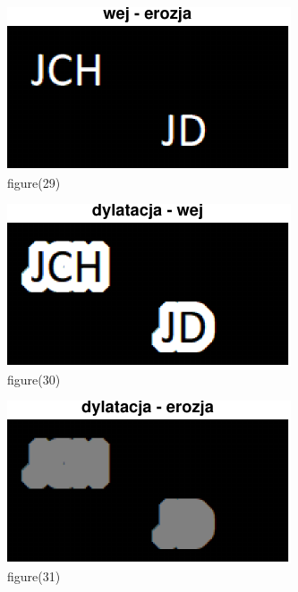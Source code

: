 \documentclass[10pt,a4paper,twoside]{article}%
\begin{document}
\begin{figure}[H]
    \centering
    \includegraphics[width=1\linewidth]{kod matlab/myVectorFile29.pdf}
\caption{figure(29)}
    \label{fig:obr1}
\end{figure}

\begin{figure}[H]
    \centering
    \includegraphics[width=1\linewidth]{kod matlab/myVectorFile30.pdf}
\caption{figure(30)}
    \label{fig:obr1}
\end{figure}

\begin{figure}[H]
    \centering
    \includegraphics[width=1\linewidth]{kod matlab/myVectorFile31.pdf}
\caption{figure(31)}
    \label{fig:obr1}
\end{figure}
\end{document}
